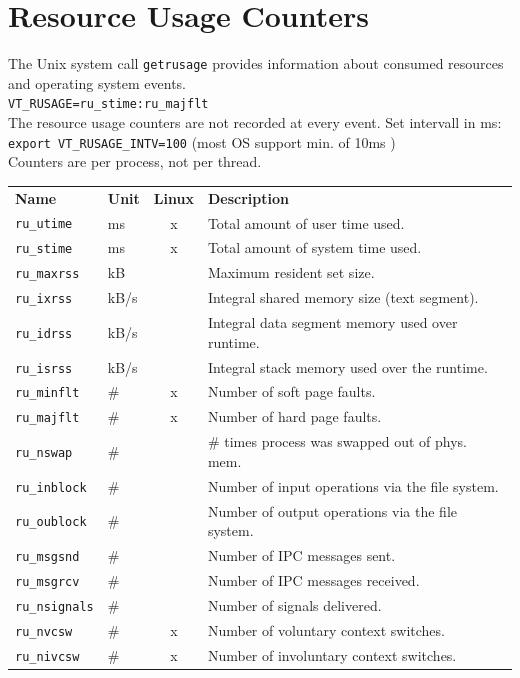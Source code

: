 \section{Resource Usage Counters}
The Unix system call \texttt{getrusage} provides information about consumed  resources and operating system events.\\
\verb|VT_RUSAGE=ru_stime:ru_majflt|\\
The resource usage counters are not recorded at every event. Set intervall in ms:\\
\texttt{export VT\_RUSAGE\_INTV=100} (most OS support min. of 10ms )\\
Counters are per process, not per thread.\\
\begin{tabular}{@{}l@{}l@{ }c@{ }l@{}}
\textbf{Name}          &  \textbf{Unit}  & \textbf{Linux} & \textbf{Description}  \\
\texttt{ru\_utime}     &  ms             & x         & Total amount of user time used.  \\
\texttt{ru\_stime}     &  ms             & x         & Total amount of system time used.  \\
\texttt{ru\_maxrss}    &  kB             &           & Maximum resident set size. \\
\texttt{ru\_ixrss}     &  kB/s           &           & Integral shared memory size (text segment). \\
\texttt{ru\_idrss}     &  kB/s           &           & Integral data segment memory used over runtime. \\
\texttt{ru\_isrss}     &  kB/s           &           & Integral stack memory used over the runtime. \\
\texttt{ru\_minflt}    &  \#             & x         & Number of soft page faults. \\
\texttt{ru\_majflt}    &  \#             & x         & Number of hard page faults. \\
\texttt{ru\_nswap}     &  \#             &           & \# times process was swapped out of phys. mem. \\
\texttt{ru\_inblock}   &  \#             &           & Number of input operations via the file system. \\
\texttt{ru\_oublock}   &  \#             &           & Number of output operations via the file system. \\
\texttt{ru\_msgsnd}    &  \#             &           & Number of IPC messages sent. \\
\texttt{ru\_msgrcv}    &  \#             &           & Number of IPC messages received. \\
\texttt{ru\_nsignals}  &  \#             &           & Number of signals delivered. \\
\texttt{ru\_nvcsw}     &  \#             & x         & Number of voluntary context switches. \\
\texttt{ru\_nivcsw}    &  \#             & x         & Number of involuntary context switches. \\
\end{tabular}\\
\vspace*{32em}



